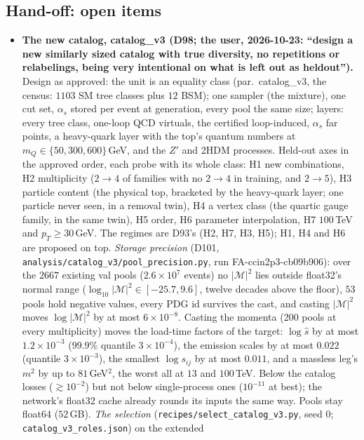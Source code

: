 \documentclass[11pt]{article}
\newcommand{\code}[1]{\texttt{#1}}
\begin{document}
\subsection{Hand-off: open items}\label{sec:ladder-open}
\begin{itemize}
  \item \textbf{The new catalog, catalog\_v3 (D98; the user, 2026-10-23: ``design a new similarly sized catalog with true
    diversity, no repetitions or relabelings, being very intentional on what is left out as heldout'').} Design as approved:
    the unit is an equality class (par.\ catalog\_v3, the census: $1103$ SM tree classes plus $12$ BSM); one sampler (the
    mixture), one cut set, $\alpha_s$ stored per event at generation, every pool the same size; layers: every tree class,
    one-loop QCD virtuals, the certified loop-induced, $\alpha_s$ far points, a heavy-quark layer with the top's quantum
    numbers at $m_Q\in\{50,300,600\}$\,GeV, and the $Z'$ and 2HDM processes. Held-out axes in the approved order, each
    probe with its whole class: H1 new combinations, H2 multiplicity ($2\to4$ of families with no $2\to4$ in training,
    and $2\to5$), H3 particle content (the physical top, bracketed by the heavy-quark layer; one particle never seen, in a
    removal twin), H4 a vertex class (the quartic gauge family, in the same twin), H5 order, H6 parameter interpolation, H7
    $100$\,TeV and $p_T\geq30$\,GeV. The regimes are D93's (H2, H7, H3, H5); H1, H4 and H6 are proposed on top.
    \emph{Storage precision} (D101, \code{analysis/catalog\_v3/pool\_precision.py}, run FA-ccin2p3-cb09b906): over
    the $2667$ existing val pools ($2.6\times10^7$ events) no $|\mathcal M|^2$ lies outside float32's normal range
    ($\log_{10}|\mathcal M|^2\in[-25.7, 9.6]$, twelve decades above the floor), $53$ pools hold negative values, every PDG id
    survives the cast, and casting $|\mathcal M|^2$ moves $\log|\mathcal M|^2$ by at most $6\times10^{-8}$. Casting the
    momenta (200 pools at every multiplicity) moves the load-time factors of the target: $\log\hat s$ by at most
    $1.2\times10^{-3}$ ($99.9\%$ quantile $3\times10^{-4}$), the emission scales by at most $0.022$ (quantile
    $3\times10^{-3}$), the smallest $\log s_{ij}$ by at most $0.011$, and a massless leg's $m^2$ by up to $81$\,GeV$^2$, the
    worst all at $13$ and $100$\,TeV. Below the catalog losses ($\gtrsim10^{-2}$) but not below single-process ones
    ($10^{-11}$ at best); the network's float32 cache already rounds its inputs the same way. Pools stay float64 ($52$\,GB).
    \emph{The selection} (\code{recipes/select\_catalog\_v3.py}, seed $0$; \code{catalog\_v3\_roles.json}) on the extended

\end{itemize}
\end{document}
